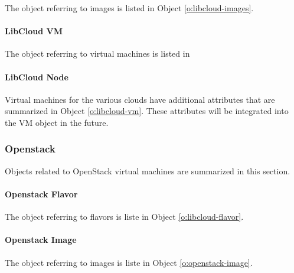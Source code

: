 \documentclass[10pt]{article}
\begin{document}
The object referring to images is listed in Object
\ref{o:libcloud-images}.



\paragraph{LibCloud VM}


The object referring to virtual machines is listed in 



\paragraph{LibCloud Node}\label{S:libcloudnode}

Virtual machines for the various clouds have additional attributes
that are summarized in Object \ref{o:libcloud-vm}. These attributes 
will be integrated into the VM object in the future.



\subsubsection{Openstack}\label{S:openstack}

Objects related to OpenStack virtual machines are summarized in this
section.

\paragraph{Openstack Flavor}

The object referring to flavors is liste in Object
\ref{o:libcloud-flavor}.


\paragraph{Openstack Image}

The object referring to images is liste in Object
\ref{o:openstack-image}.

\end{document}
